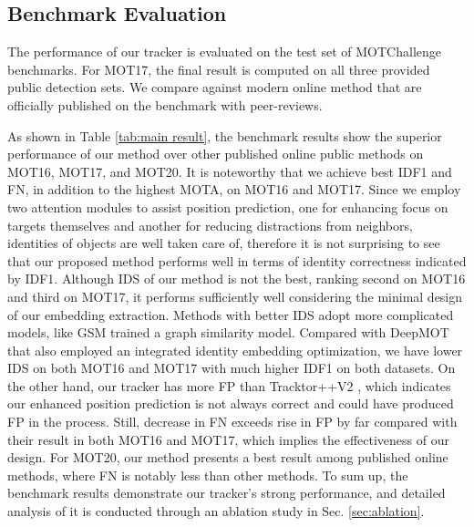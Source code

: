 \documentclass[final]{cvpr}
\begin{document}
\subsection{Benchmark Evaluation}
The performance of our tracker is evaluated on the test set of MOTChallenge benchmarks. For MOT17, the final result is computed on all three provided public detection sets. We compare against modern online method that are officially published on the benchmark with peer-reviews.

As shown in Table \ref{tab:main result}, the benchmark results show the superior performance of our method over other published online public methods on MOT16, MOT17, and MOT20. It is noteworthy that we achieve best IDF1 and FN, in addition to the highest MOTA, on MOT16 and MOT17. Since we employ two attention modules to assist position prediction, one for enhancing focus on targets themselves and another for reducing distractions from neighbors, identities of objects are well taken care of, therefore it is not surprising to see that our proposed method performs well in terms of identity correctness indicated by IDF1. Although IDS of our method is not the best, ranking second on MOT16 and third on MOT17, it performs sufficiently well considering the minimal design of our embedding extraction. Methods with better IDS adopt more complicated models, like GSM \cite{Liu2020} trained a graph similarity model. Compared with DeepMOT \cite{Xu2020a} that also employed an integrated identity embedding optimization, we have lower IDS on both MOT16 and MOT17 with much higher IDF1 on both datasets. On the other hand, our tracker has more FP than Tracktor++V2 \cite{Bergmann2019a}, which indicates our enhanced position prediction is not always correct and could have produced FP in the process. Still, decrease in FN exceeds rise in FP by far compared with their result in both MOT16 and MOT17, which implies the effectiveness of our design.
For MOT20, our method presents a best result among published online methods, where FN is notably less than other methods.
To sum up, the benchmark results demonstrate our tracker's strong performance, and detailed analysis of it is conducted through an ablation study in Sec. \ref{sec:ablation}.
\end{document}
